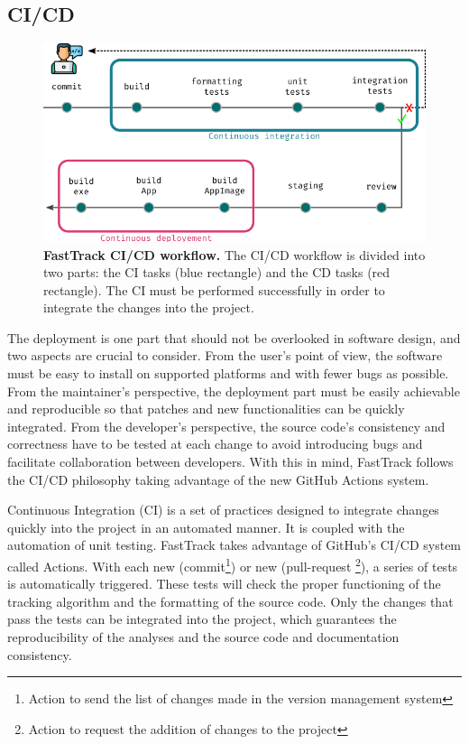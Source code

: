     \subsection{CI/CD}
    \label{part_1:cicd}

    \begin{figure}[h!]
    \centering
    \includegraphics[width=1\textwidth]{part_1/assets/Figure_cicd.png}
    \caption{{\bf FastTrack CI/CD workflow.} The CI/CD workflow is divided into two parts: the CI tasks (blue rectangle) and the CD tasks (red rectangle). The CI must be performed successfully in order to integrate the changes into the project.}
    \label{part_1:fig_cicd}
    \end{figure}

    The deployment is one part that should not be overlooked in software design, and two aspects are crucial to consider. From the user's point of view, the software must be easy to install on supported platforms and with fewer bugs as possible. From the maintainer's perspective, the deployment part must be easily achievable and reproducible so that patches and new functionalities can be quickly integrated. From the developer's perspective, the source code's consistency and correctness have to be tested at each change to avoid introducing bugs and facilitate collaboration between developers.  With this in mind, FastTrack follows the CI/CD philosophy \cite{shahin2017continuous}\cite{wikstrom2019benefits} taking advantage of the new GitHub Actions system.

    Continuous Integration (CI) is a set of practices designed to integrate changes quickly into the project in an automated manner. It is coupled with the automation of unit testing. FastTrack takes advantage of GitHub's CI/CD system called Actions. With each new (commit\footnote{Action to send the list of changes made in the version management system}) or new (pull-request \footnote{Action to request the addition of changes to the project}), a series of tests is automatically triggered. These tests will check the proper functioning of the tracking algorithm and the formatting of the source code. Only the changes that pass the tests can be integrated into the project, which guarantees the reproducibility of the analyses and the source code and documentation consistency.

